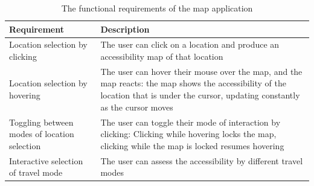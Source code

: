 \begin{table}[H]
	\caption{The functional requirements of the map application}
	\label{tab:functional requirements}
	\centering
	\begin{tabular}{ | L{0.3\textwidth} | L{0.6\textwidth} | }
		\hline
		Requirement
		& Description
		\\
		\hline
		\hline
		Location selection by clicking
		& The user can click on a location and produce an accessibility map of that location
		\\
		\hline
		Location selection by hovering
		& The user can hover their mouse over the map, and the map reacts:
		the map shows the accessibility of the location that is under the cursor,
		updating constantly as the cursor moves
		\\
		\hline
		Toggling between modes of location selection
		& The user can toggle their mode of interaction by clicking:
		Clicking while hovering locks the map, clicking while the map is locked resumes hovering
		\\
		\hline
		Interactive selection of travel mode
		& The user can assess the accessibility by different travel modes
		\\
		\hline
	\end{tabular}
\end{table}

